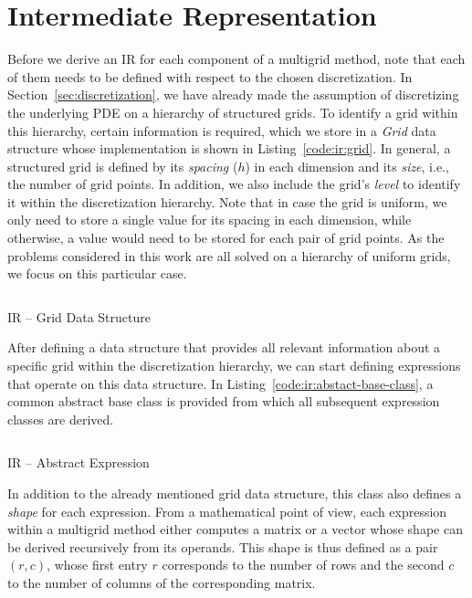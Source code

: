 \section{Intermediate Representation}
\label{sec:intermediate-representation}
Before we derive an IR for each component of a multigrid method, note that each of them needs to be defined with respect to the chosen discretization.
In Section~\ref{sec:discretization}, we have already made the assumption of discretizing the underlying PDE on a hierarchy of structured grids.
To identify a grid within this hierarchy, certain information is required, which we store in a \emph{Grid} data structure whose implementation is shown in Listing~\ref{code:ir:grid}.
In general, a structured grid is defined by its \emph{spacing} ($h$) in each dimension and its \emph{size}, i.e., the number of grid points.
In addition, we also include the grid's \emph{level} to identify it within the discretization hierarchy.
Note that in case the grid is uniform, we only need to store a single value for its spacing in each dimension, while otherwise, a value would need to be stored for each pair of grid points.
As the problems considered in this work are all solved on a hierarchy of uniform grids, we focus on this particular case.
\begin{listing}
	\inputminted{python}{evostencils/ir/grid.py}
	\caption{IR -- Grid Data Structure}
	\label{code:ir:grid}
\end{listing}
After defining a data structure that provides all relevant information about a specific grid within the discretization hierarchy, we can start defining expressions that operate on this data structure.
In Listing~\ref{code:ir:abstact-base-class}, a common abstract base class is provided from which all subsequent expression classes are derived.
\begin{listing}
	\inputminted{python}{evostencils/ir/expression.py}
	\caption{IR -- Abstract Expression}
	\label{code:ir:abstact-base-class}
\end{listing}
In addition to the already mentioned grid data structure, this class also defines a \emph{shape} for each expression.
From a mathematical point of view, each expression within a multigrid method either computes a matrix or a vector whose shape can be derived recursively from its operands.
This shape is thus defined as a pair $(r, c)$, whose first entry $r$ corresponds to the number of rows and the second $c$ to the number of columns of the corresponding matrix.
